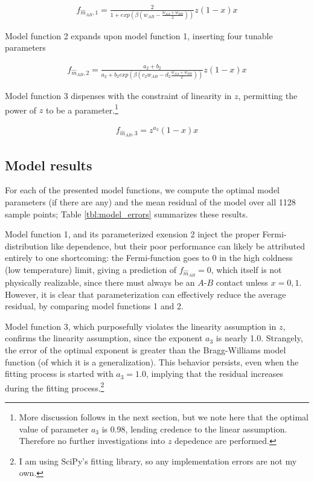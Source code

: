 \documentclass[10pt]{article}
\begin{document}
\begin{align}
    f_{\hat{m}_{AB},1} = 
    \frac{2}{1 + exp\left(\beta \left(w_{AB} - \frac{w_{AA} + w_{BB}}{2}\right) \right)}
    z (1-x) x
\end{align}

Model function 2 expands upon model function 1, inserting four tunable parameters

\begin{align}
    f_{\hat{m}_{AB},2} = 
    \frac{a_2+b_2}{a_2 + b_2 exp\left(\beta \left(c_2 w_{AB} - d_2 \frac{w_{AA} + w_{BB}}{2}\right) \right)}
    z (1-x) x
\end{align}

Model function 3 dispenses with the constraint of linearity in $z$, permitting the power of $z$ to be a parameter.\footnote{More discussion follows in the next section, but we note here that the optimal value of parameter $a_3$ is $0.98$, lending credence to the linear assumption.
Therefore no further investigations into $z$ depedence are performed.}

\begin{align}
    f_{\hat{m}_{AB},3} = z^{a_3} (1-x) x
\end{align}

\subsection{Model results}
For each of the presented model functions, we compute the optimal model parameters (if there are any) and the mean residual of the model over all 1128 sample points; Table \ref{tbl:model_errors} summarizes these results.

Model function 1, and its parameterized exension 2 inject the proper Fermi-distribution like dependence, but their poor performance can likely be attributed entirely to one shortcoming: the Fermi-function goes to $0$ in the high coldness (low temperature) limit, giving a prediction of $f_{\hat{m}_{AB}} = 0$, which itself is not physically realizable, since there must always be an $A$-$B$ contact unless $x=0,1$.
However, it is clear that parameterization can effectively reduce the average residual, by comparing model functions 1 and 2.

Model function 3, which purposefully violates the linearity assumption in $z$, confirms the linearity assumption, since the exponent $a_3$ is nearly 1.0. Strangely, the error of the optimal exponent is greater than the Bragg-Williams model function (of which it is a generalization). This behavior persists, even when the fitting process is started with $a_3 = 1.0$, implying that the residual increases during the fitting process.\footnote{I am using SciPy's fitting library, so any implementation errors are not my own.}
\end{document}
